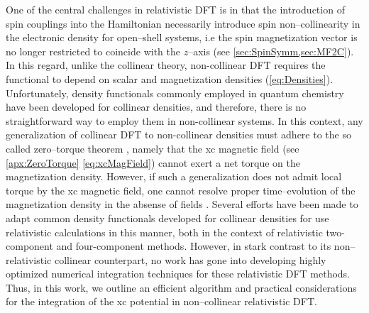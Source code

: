 One of the central challenges in relativistic DFT is in that the introduction
of spin couplings into the Hamiltonian necessarily introduce spin
non--collinearity  in the electronic density for open--shell systems, i.e the
spin magnetization vector is no longer restricted to coincide with the
$z$--axis (see \cref{sec:SpinSymm,sec:MF2C}). In this regard, unlike the collinear
theory, non-collinear DFT requires the functional to depend on scalar and magnetization
densities (\cref{eq:Densities}).
Unfortunately, density functionals commonly
employed in quantum chemistry have been developed for collinear densities, and
therefore, there is no straightforward way to employ them in non-collinear
systems.  
%
%
In this context, any generalization of collinear DFT to non-collinear densities
must adhere to the so called zero--torque theorem \cite{Gyorffy01_206403},
namely that the xc magnetic field (see \cref{apx:ZeroTorque} \cref{eq:xcMagField}) cannot
exert a net torque on the magnetization density. However, if such a generalization
does not admit local torque by the xc magnetic field, one cannot resolve proper
time--evolution of the magnetization density in the absense of fields
\cite{Gyorffy01_206403,Gyorffy03_354,Gross07_196405,Frisch07_125119,Frisch12_2193,Scuseria13_035117,Li17_2591}.
%
Several efforts have been made to adapt common density functionals
developed for collinear densities for use 
relativistic calculations in this manner, both in the context of relativistic
two-component \cite{Wullen02_779,Liu03_597,Ziegler04_12191,Liu05_144101,Frisch07_125119,Frisch12_2193,Scuseria13_035117,Li17_2591}
and four-component
\cite{Helgaker02_814,Saue03_10418,Servedio99_23,Liu03_597,Engel04_012505}
methods.  
However, in stark contrast to its non--relativistic collinear counterpart, no work has gone into developing highly optimized
numerical integration techniques for these relativistic DFT methods. Thus, in this work, we outline an efficient algorithm 
and practical considerations for the integration of the xc potential in non--collinear relativistic DFT.















